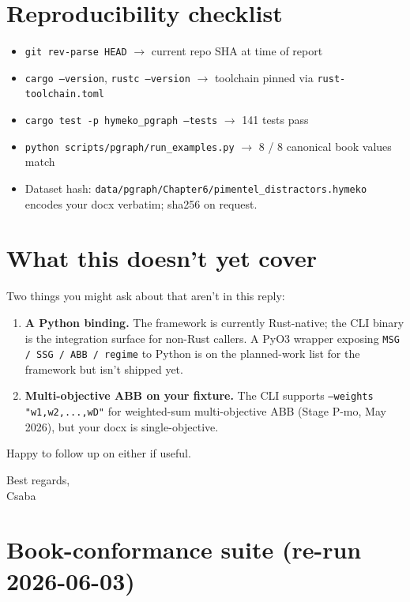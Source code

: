 \documentclass[11pt]{article}
\begin{document}
\section*{Reproducibility checklist}

\begin{itemize}[leftmargin=2em,itemsep=0pt]
  \item \texttt{git rev-parse HEAD} $\to$ current repo SHA at time of report
  \item \texttt{cargo --version}, \texttt{rustc --version} $\to$ toolchain pinned via
        \texttt{rust-toolchain.toml}
  \item \texttt{cargo test -p hymeko\_pgraph --tests} $\to$ 141 tests pass
  \item \texttt{python scripts/pgraph/run\_examples.py} $\to$ 8 / 8 canonical book values match
  \item Dataset hash: \texttt{data/pgraph/Chapter6/pimentel\_distractors.hymeko}
        encodes your docx verbatim; sha256 on request.
\end{itemize}

\section*{What this doesn't yet cover}

Two things you might ask about that aren't in this reply:

\begin{enumerate}[leftmargin=2em,itemsep=0pt]
  \item \textbf{A Python binding.} The framework is currently Rust-native; the
        CLI binary is the integration surface for non-Rust callers. A
        PyO3 wrapper exposing \texttt{MSG / SSG / ABB / regime} to Python is on
        the planned-work list for the framework but isn't shipped yet.
  \item \textbf{Multi-objective ABB on your fixture.} The CLI supports
        \texttt{--weights "w1,w2,...,wD"} for weighted-sum multi-objective ABB
        (Stage P-mo, May 2026), but your docx is single-objective.
\end{enumerate}

Happy to follow up on either if useful.

\vspace{1em}
\noindent Best regards,\\
Csaba

\appendix

\section{Book-conformance suite (re-run 2026-06-03)}
\label{app:book}
\end{document}

